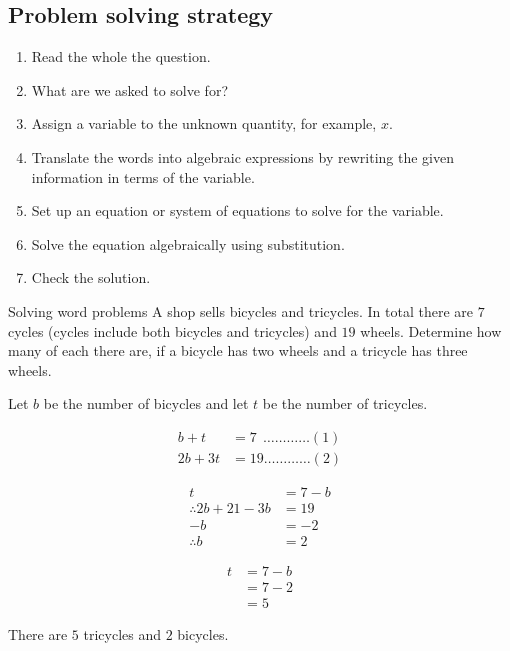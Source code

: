 \subsection*{Problem solving strategy}

\begin{enumerate}[noitemsep, label=\textbf{\arabic*}. ] 
\item Read the whole the question.
\item What are we asked to solve for?
\item Assign a variable to the unknown quantity, for example, $x$.
\item  Translate the words into algebraic expressions by rewriting the given information in terms of the variable. 
\item Set up an equation or system of equations to solve for the variable.
\item Solve the equation algebraically using substitution.
\item Check the solution.
\end{enumerate}
\begin{wex}
{Solving word problems}
{A shop sells bicycles and tricycles. In total there are $7$ cycles (cycles include both bicycles and tricycles) and $19$ wheels. Determine how many of each there are, if a bicycle has two wheels and a tricycle has three wheels.}
{
Let $b$ be the number of bicycles and let $t$ be the number of tricycles. 

\begin{align*}
  b + t &= 7 ~~\ldots \ldots \ldots \ldots (1)\\
  2b + 3t &= 19 \ldots \ldots \ldots \ldots (2)
\end{align*}

\begin{align*}
  t &= 7-b \\
  \therefore 2b + 21 - 3b &= 19 \\
  -b &= -2 \\
  \therefore b &= 2
\end{align*}

\begin{align*}
  t &= 7-b \\
    &= 7-2 \\
    &= 5
\end{align*}

There are $5$ tricycles and $2$ bicycles.
}       
\end{wex}

